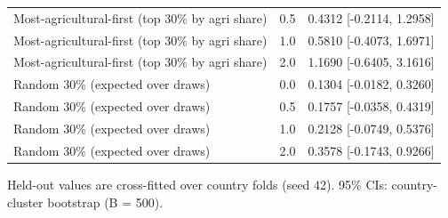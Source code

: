 \begin{table}[htbp]
\begin{tabular}{llr}
Most-agricultural-first (top 30\% by agri share) & 0.5 & 0.4312 [-0.2114, 1.2958] \\
Most-agricultural-first (top 30\% by agri share) & 1.0 & 0.5810 [-0.4073, 1.6971] \\
Most-agricultural-first (top 30\% by agri share) & 2.0 & 1.1690 [-0.6405, 3.1616] \\
Random 30\% (expected over draws) & 0.0 & 0.1304 [-0.0182, 0.3260] \\
Random 30\% (expected over draws) & 0.5 & 0.1757 [-0.0358, 0.4319] \\
Random 30\% (expected over draws) & 1.0 & 0.2128 [-0.0749, 0.5376] \\
Random 30\% (expected over draws) & 2.0 & 0.3578 [-0.1743, 0.9266] \\
\bottomrule
\end{tabular}
\par\smallskip\footnotesize Held-out values are cross-fitted over country folds (seed 42). 95\% CIs: country-cluster bootstrap (B = 500).
\end{table}
